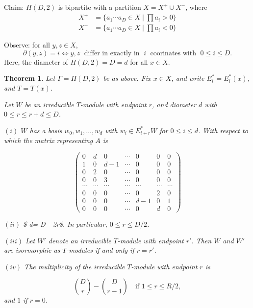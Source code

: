 \documentclass[
]{book}
\newtheorem{theorem}{Theorem}[chapter]
\theoremstyle{definition}
\theoremstyle{definition}
\theoremstyle{definition}
\theoremstyle{definition}
\theoremstyle{remark}
\begin{document}
Claim: \(H(D,2)\) is bipartite with a partition \(X = X^+ \cup X^-\), where
\begin{align}
X^+ & = \{a_1\cdots a_D\in X\mid \prod a_i > 0\}\\
X^- & = \{a_1\cdots a_D \in X \mid \prod a_i < 0\}
\end{align}

Observe: for all \(y, z\in X\),
\[\partial(y,z) = i \Leftrightarrow y, z \; \text{ differ in exactly in }\; i\; \text{ coorinates with }\; 0\leq i\leq D.\]
Here, the diameter of \(H(D, 2) = D = d\) for all \(x\in X\).

\begin{theorem}
\protect\hypertarget{thm:hd2-modules}{}\label{thm:hd2-modules}Let \(\Gamma = H(D,2)\) be as above. Fix \(x\in X\), and write \(E_i^* = E^*_i(x)\), and \(T = T(x)\).

Let \(W\) be an irreducible \(T\)-module with endpoint \(r\), and diameter \(d\) with \(0\leq r \leq r+d\leq D\).

\((i)\) \(W\) has a basis \(w_0, w_1, \ldots, w_d\) with \(w_i\in E^*_{i+r}W\) for \(0\leq i\leq d\). With respect to which the matrix representing \(A\) is

\[
\begin{pmatrix}
0 & d & 0 & \cdots & 0 & 0 & 0\\
1 & 0 & d-1 & \cdots & 0 & 0 & 0\\
0 & 2 & 0 & \cdots & 0 & 0 & 0\\
0 & 0 & 3 & \cdots & 0 & 0 & 0\\
\cdots & \cdots & \cdots & \cdots & \cdots & \cdots & \cdots \\
0 & 0 & 0 & \cdots & 0 & 2 & 0\\
0 & 0 & 0 & \cdots & d-1 & 0 & 1\\
0 & 0 & 0 & \cdots & 0 & d & 0
\end{pmatrix}
\]

\((ii)\) \$ d= D - 2r\$. In particular, \(0\leq r\leq D/2\).

\((iii)\) Let \(W'\) denote an irreducible \(T\)-module with endpoint \(r'\). Then \(W\) and \(W'\) are isormorphic as \(T\)-modules if and only if \(r = r'\).

\((iv)\) The multiplicity of the irreducible \(T\)-module with endpoint \(r\) is

\[\binom{D}{r} - \binom{D}{r-1} \quad \text{if } 1\leq r \leq R/2,\]
and \(1\) if \(r = 0\).
\end{theorem}
\end{document}
